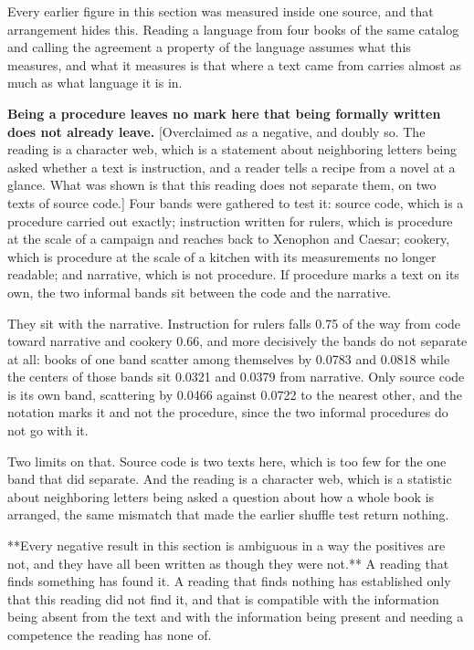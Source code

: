 Every earlier figure in this section was measured inside one source, and that arrangement hides this. Reading a language from four books of the same catalog and calling the agreement a property of the language assumes what this measures, and what it measures is that where a text came from carries almost as much as what language it is in.

\textbf{Being a procedure leaves no mark here that being formally written does not already leave.} [Overclaimed as a negative, and doubly so. The reading is a character web, which is a statement about neighboring letters being asked whether a text is instruction, and a reader tells a recipe from a novel at a glance. What was shown is that this reading does not separate them, on two texts of source code.] Four bands were gathered to test it: source code, which is a procedure carried out exactly; instruction written for rulers, which is procedure at the scale of a campaign and reaches back to Xenophon and Caesar; cookery, which is procedure at the scale of a kitchen with its measurements no longer readable; and narrative, which is not procedure. If procedure marks a text on its own, the two informal bands sit between the code and the narrative.

They sit with the narrative. Instruction for rulers falls 0.75 of the way from code toward narrative and cookery 0.66, and more decisively the bands do not separate at all: books of one band scatter among themselves by 0.0783 and 0.0818 while the centers of those bands sit 0.0321 and 0.0379 from narrative. Only source code is its own band, scattering by 0.0466 against 0.0722 to the nearest other, and the notation marks it and not the procedure, since the two informal procedures do not go with it.

Two limits on that. Source code is two texts here, which is too few for the one band that did separate. And the reading is a character web, which is a statistic about neighboring letters being asked a question about how a whole book is arranged, the same mismatch that made the earlier shuffle test return nothing.

**Every negative result in this section is ambiguous in a way the positives are not, and they have all been written as though they were not.** A reading that finds something has found it. A reading that finds nothing has established only that this reading did not find it, and that is compatible with the information being absent from the text and with the information being present and needing a competence the reading has none of.

